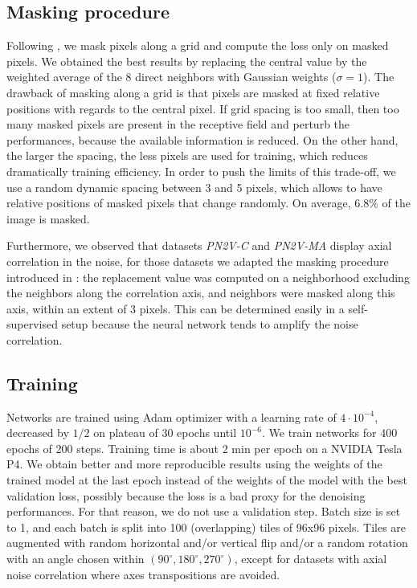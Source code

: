 \documentclass{article}
\begin{document}
\subsection{Masking procedure}
\label{sec:masking}
Following \cite{batson2019noise2self}, we mask pixels along a grid and compute the loss only on masked pixels.
We obtained the best results by replacing the central value by the weighted average of the 8 direct neighbors with Gaussian weights ($\sigma=1$).
The drawback of masking along a grid is that pixels are masked at fixed relative positions with regards to the central pixel.
If grid spacing is too small, then too many masked pixels are present in the receptive field and perturb the performances, because the available information is reduced.
On the other hand, the larger the spacing, the less pixels are used for training, which reduces dramatically training efficiency.
In order to push the limits of this trade-off, we use a random dynamic spacing between 3 and 5 pixels, which allows to have relative positions of masked pixels that change randomly.
On average, $6.8\%$ of the image is masked.

Furthermore, we observed that datasets \emph{PN2V-C} and \emph{PN2V-MA} display axial correlation in the noise, for those datasets we adapted the masking procedure introduced in \cite{broaddus2020removing}: the replacement value was computed on a neighborhood excluding the neighbors along the correlation axis, and neighbors were masked along this axis, within an extent of 3 pixels. This can be determined easily in a self-supervised setup because the neural network tends to amplify the noise correlation.

\subsection{Training}
\label{sec:training}
Networks are trained using Adam optimizer with a learning rate of $4\cdot10^{-4}$, decreased by $1/2$ on plateau of 30 epochs until $10^{-6}$. We train networks for 400 epochs of 200 steps.
Training time is about 2 min per epoch on a NVIDIA Tesla P4.
We obtain better and more reproducible results using the weights of the trained model at the last epoch instead of the weights of the model with the best validation loss, possibly because the loss is a bad proxy for the denoising performances. For that reason, we do not use a validation step.
Batch size is set to 1, and each batch is split into 100 (overlapping) tiles of 96x96 pixels.
Tiles are augmented with random horizontal and/or vertical flip and/or a random rotation with an angle chosen within $(90^\circ, 180^\circ, 270^\circ)$, except for datasets with axial noise correlation where axes transpositions are avoided.
\end{document}

